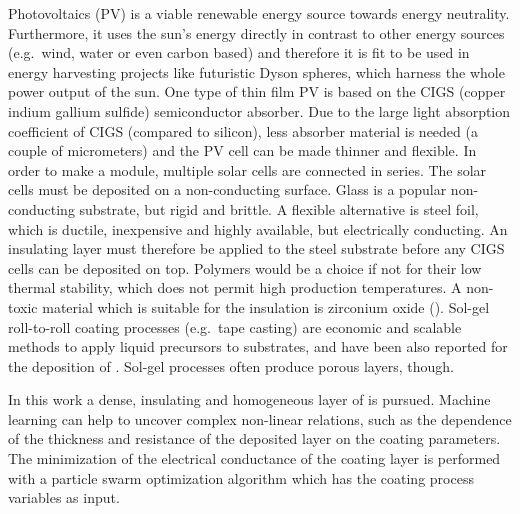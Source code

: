 Photovoltaics (PV) is a viable renewable energy source towards energy neutrality.
Furthermore, 
it uses the sun's energy directly in contrast to other energy sources (e.g.\ wind, water or even carbon based) and therefore 
it is fit to be used in energy harvesting projects like futuristic Dyson spheres\cite{dyson1960search, kardashev1964transmission}, which harness the whole power output of the sun.
%
One type  of thin film PV is based on the CIGS (copper indium gallium sulfide) semiconductor absorber\cite{Vasekar2010}. 
Due to the large light absorption coefficient of CIGS (compared to silicon), less absorber material is needed (a couple of micrometers) and the PV cell can be made thinner and flexible. 
In order to make a module, multiple solar cells are connected in series. 
The solar cells must be deposited on a non-conducting surface.
Glass is a popular non-conducting substrate, but rigid and brittle. 
A flexible alternative is steel foil, which is ductile, inexpensive and highly available, but electrically conducting. 
An insulating layer must therefore be applied to the steel substrate before any CIGS cells can be deposited on top.
Polymers would be a choice if not for their low thermal stability, which does not permit high production temperatures.
A non-toxic material which is suitable for the insulation is zirconium oxide (). 
Sol-gel roll-to-roll coating processes (e.g.\ tape casting) are economic and scalable methods to apply liquid precursors to substrates, and have been also reported for the deposition of \cite{yeo1998design,michalek2015comparison}.
Sol-gel processes often produce porous layers, though. 

In this work a dense, insulating and homogeneous layer of  is pursued. 
Machine learning can help to uncover complex non-linear relations, such as the 
dependence of the thickness and resistance of the deposited layer on the coating parameters.
The minimization of the electrical conductance of the coating layer is performed with a particle swarm optimization 
algorithm which has the coating process variables as input. 


